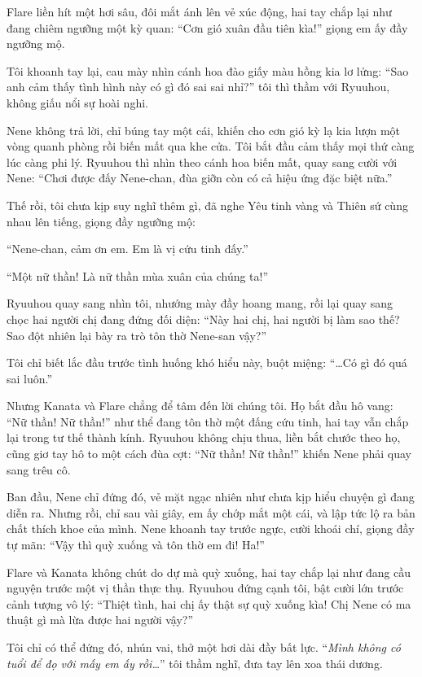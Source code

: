 \documentclass[../main.tex]{subfiles}
\begin{document}
Flare liền hít một hơi sâu, đôi mắt ánh lên vẻ xúc động, hai tay chắp lại như đang chiêm ngưỡng một kỳ quan: ``Cơn gió xuân đầu tiên kìa!'' giọng em ấy đầy ngưỡng mộ.

Tôi khoanh tay lại, cau mày nhìn cánh hoa đào giấy màu hồng kia lơ lửng: ``Sao anh cảm thấy tình hình này có gì đó sai sai nhỉ?'' tôi thì thầm với Ryuuhou, không giấu nổi sự hoài nghi.

Nene không trả lời, chỉ búng tay một cái, khiến cho cơn gió kỳ lạ kia lượn một vòng quanh phòng rồi biến mất qua khe cửa. Tôi bắt đầu cảm thấy mọi thứ càng lúc càng phi lý. Ryuuhou thì nhìn theo cánh hoa biến mất, quay sang cười với Nene: ``Chơi được đấy Nene-chan, đùa giỡn còn có cả hiệu ứng đặc biệt nữa.''

Thế rồi, tôi chưa kịp suy nghĩ thêm gì, đã nghe Yêu tinh vàng và Thiên sứ cùng nhau lên tiếng, giọng đầy ngưỡng mộ:

``Nene-chan, cảm ơn em. Em là vị cứu tinh đấy.''

``Một nữ thần! Là nữ thần mùa xuân của chúng ta!''

Ryuuhou quay sang nhìn tôi, nhướng mày đầy hoang mang, rồi lại quay sang chọc hai người chị đang đứng đối diện: ``Này hai chị, hai người bị làm sao thế? Sao đột nhiên lại bày ra trò tôn thờ Nene-san vậy?''

Tôi chỉ biết lắc đầu trước tình huống khó hiểu này, buột miệng: ``\dots Có gì đó quá sai luôn.''

Nhưng Kanata và Flare chẳng để tâm đến lời chúng tôi. Họ bắt đầu hô vang: ``Nữ thần! Nữ thần!'' như thể đang tôn thờ một đấng cứu tinh, hai tay vẫn chắp lại trong tư thế thành kính. Ryuuhou không chịu thua, liền bắt chước theo họ, cũng giơ tay hô to một cách đùa cợt: ``Nữ thần! Nữ thần!'' khiến Nene phải quay sang trêu cô.

Ban đầu, Nene chỉ đứng đó, vẻ mặt ngạc nhiên như chưa kịp hiểu chuyện gì đang diễn ra. Nhưng rồi, chỉ sau vài giây, em ấy chớp mắt một cái, và lập tức lộ ra bản chất thích khoe của mình. Nene khoanh tay trước ngực, cười khoái chí, giọng đầy tự mãn: ``Vậy thì quỳ xuống và tôn thờ em đi! Ha!''

Flare và Kanata không chút do dự mà quỳ xuống, hai tay chắp lại như đang cầu nguyện trước một vị thần thực thụ. Ryuuhou đứng cạnh tôi, bật cười lớn trước cảnh tượng vô lý: ``Thiệt tình, hai chị ấy thật sự quỳ xuống kìa! Chị Nene có ma thuật gì mà lừa được hai người vậy?''

Tôi chỉ có thể đứng đó, nhún vai, thở một hơi dài đầy bất lực. ``\textit{Mình không có tuổi để đọ với mấy em ấy rồi\dots}'' tôi thầm nghĩ, đưa tay lên xoa thái dương.
\end{document}
